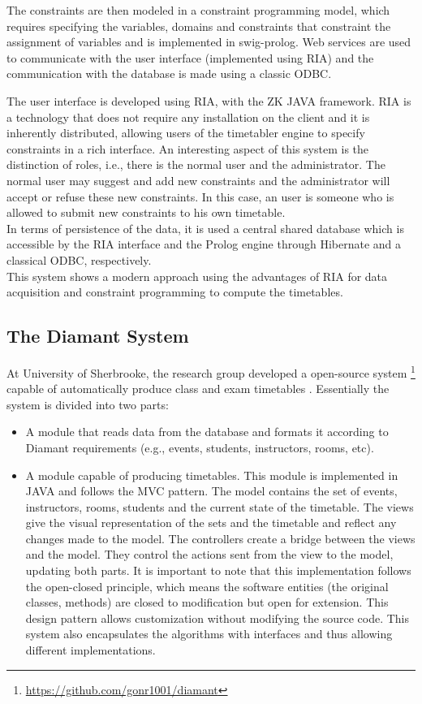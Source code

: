 The constraints are then modeled in a constraint programming model, which requires specifying the variables, domains and constraints that constraint the assignment of variables and is implemented in swig-prolog. Web services are used to communicate with the user interface (implemented using RIA) and the communication with the database is made using a classic ODBC. 

The user interface is developed using RIA, with the ZK JAVA framework. RIA is a technology that does not require any installation on the client and it is inherently distributed, allowing users of the timetabler engine to specify constraints in a rich interface. An interesting aspect of this system is the distinction of roles, i.e., there is the normal user and the administrator. The normal user may suggest and add new constraints and the administrator will accept or refuse these new constraints. In this case, an user is someone who is allowed to submit new constraints to his own timetable.\\
In terms of persistence of the data, it is used a central shared database which is accessible by the RIA interface and the Prolog engine through Hibernate and a classical ODBC, respectively. \\
This system shows a modern approach using the advantages of RIA for data acquisition and constraint programming to compute the timetables.

\subsection{The Diamant System}

At University of Sherbrooke, the research group developed a open-source system \footnote{\href{https://github.com/gonr1001/diamant}{https://github.com/gonr1001/diamant}} capable of automatically produce class and exam timetables \citep{diamant}. Essentially the system is divided into two parts:
\begin{itemize}
	\item A module that reads data from the database and formats it according to Diamant requirements (e.g., events, students, instructors, rooms, etc).
	\item A module capable of producing timetables. This module is implemented in JAVA and follows the MVC pattern. The model contains the set of events, instructors, rooms, students and the current state of the timetable. The views give the visual representation of the sets and the timetable and reflect any changes made to the model. The controllers create a bridge between the views and the model. They control the actions sent from the view to the model, updating both parts. It is important to note that this implementation follows the open-closed principle, which means the software entities (the original classes, methods) are closed to modification but open for extension. This design pattern allows customization without modifying the source code. This system also encapsulates the algorithms with interfaces and thus allowing different implementations. 
\end{itemize}

